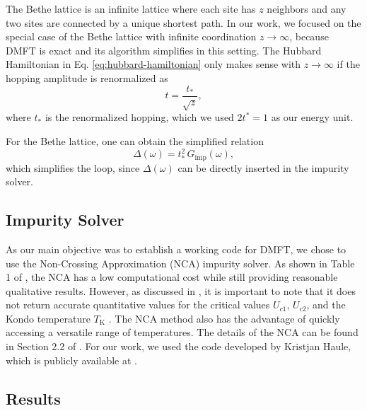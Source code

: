 \documentclass[12pt]{report}
\newcommand{\ALERT}[1]{\textcolor{red}{#1}}
\begin{document}
The Bethe lattice is an infinite lattice where each site has $z$ neighbors and any two sites are connected by a unique shortest path. In our work, we focused on the special case of the Bethe lattice with infinite coordination $z\to\infty$, because DMFT is exact and its algorithm simplifies in this setting. The Hubbard Hamiltonian in Eq. \eqref{eq:hubbard-hamiltonian} only makes sense with $z\to\infty$ if the hopping amplitude is renormalized as \cite{thesis_bruno}
\begin{equation} \label{eq:hopping-renormalization}
t = \frac{t_*}{\sqrt{z}},
\end{equation}
where $t_*$ is the renormalized hopping, which we used $2t^* = 1$ as our energy unit.

For the Bethe lattice, one can obtain the simplified relation \cite{thesis_bruno}
\begin{equation} \label{eq:simple-hybridization-bethe}
\Delta(\omega) = t_*^2 \, G_{\text{imp}}(\omega),
\end{equation}
which simplifies the loop, since $\Delta(\omega)$ can be directly inserted in the impurity solver.

\subsection{Impurity Solver} \label{sec:impurity-solver}

As our main objective was to establish a working code for DMFT, we chose to use the Non-Crossing Approximation (NCA) impurity solver. As shown in Table 1 of \cite{impurity-solvers}, the NCA has a low computational cost while still providing reasonable qualitative results. However, as discussed in \cite{vildosola2015}, it is important to note that it does not return accurate quantitative values for the critical values $U_{c1}$, $U_{c2}$, and the Kondo temperature $T_{\text{K}}$ \cite{haule_real_materials, vildosola2015}. The NCA method also has the advantage of quickly accessing a versatile range of temperatures. The details of the NCA can be found in Section 2.2 of \cite{thesis_bruno}. For our work, we used the code developed by Kristjan Haule, which is publicly available at \cite{hauleweb}.


\subsection{Results} \label{sec:results}
\end{document}
